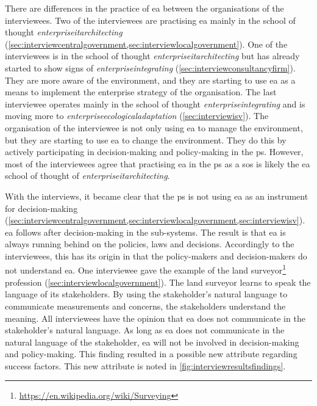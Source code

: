 There are differences in the practice of \acrshort{ea} between the organisations of the interviewees. Two of the interviewees are practising \acrshort{ea} mainly in the school of thought \textit{\gls{enterpriseitarchitecting}} (\cref{sec:interviewcentralgovernment,sec:interviewlocalgovernment}). One of the interviewees is in the school of thought \textit{\gls{enterpriseitarchitecting}} but has already started to show signs of \textit{\gls{enterpriseintegrating}} (\cref{sec:interviewconsultancyfirm}). They are more aware of the environment, and they are starting to use \acrshort{ea} as a means to implement the enterprise strategy of the organisation. The last interviewee operates mainly in the school of thought \textit{\gls{enterpriseintegrating}} and is moving more to \textit{\gls{enterpriseecologicaladaptation}} (\cref{sec:interviewisv}). The organisation of the interviewee is not only using \acrshort{ea} to manage the environment, but they are starting to use \acrshort{ea} to change the environment. They do this by actively participating in decision-making and policy-making in the \gls{ps}. However, most of the interviewees agree that practising \acrshort{ea} in the \gls{ps} as a \acrlong{sos} is likely the \acrshort{ea} school of thought of \textit{\gls{enterpriseitarchitecting}}.

With the interviews, it became clear that the \gls{ps} is not using \acrshort{ea} as an instrument for decision-making (\cref{sec:interviewcentralgovernment,sec:interviewlocalgovernment,sec:interviewisv}). \acrshort{ea} follows after decision-making in the sub-systems. The result is that \acrshort{ea} is always running behind on the policies, laws and decisions. Accordingly to the interviewees, this has its origin in that the policy-makers and decision-makers do not understand \acrshort{ea}. One interviewee gave the example of the land surveyor\footnote{\url{https://en.wikipedia.org/wiki/Surveying}} profession (\cref{sec:interviewlocalgovernment}). The land surveyor learns to speak the language of its stakeholders. By using the stakeholder's natural language to communicate measurements and concerns, the stakeholders understand the meaning. All interviewees have the opinion that \acrshort{ea} does not communicate in the stakeholder's natural language. As long as \acrshort{ea} does not communicate in the natural language of the stakeholder, \acrshort{ea} will not be involved in decision-making and policy-making. This finding resulted in a possible new \gls{attribute} regarding success factors. This new \gls{attribute} is noted in \cref{fig:interviewresultsfindings}.
